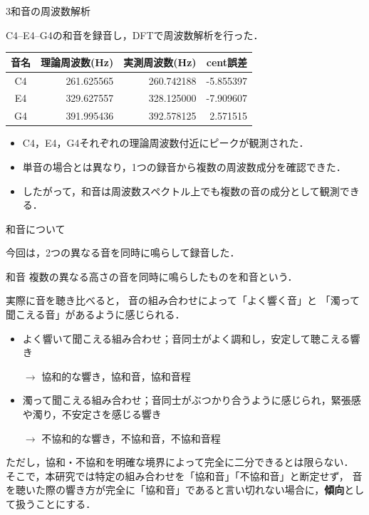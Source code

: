 \documentclass[dvipdfmx,uplatex]{beamer}
\begin{document}
\begin{frame}{3和音の周波数解析}

  C4--E4--G4の和音を録音し，DFTで周波数解析を行った．

  \begin{table}[!ht]
    \centering
    \begin{tabular}{|c|r|r|r|}
      \hline
      音名 & 理論周波数(Hz) & 実測周波数(Hz) & cent誤差 \\ \hline
      C4 & 261.625565 & 260.742188 & -5.855397 \\ \hline
      E4 & 329.627557 & 328.125000 & -7.909607 \\ \hline
      G4 & 391.995436 & 392.578125 & 2.571515 \\ \hline
    \end{tabular}
  \end{table}

  \begin{itemize}
    \item C4，E4，G4それぞれの理論周波数付近にピークが観測された．
    \item 単音の場合とは異なり，1つの録音から複数の周波数成分を確認できた．
    \item したがって，和音は周波数スペクトル上でも複数の音の成分として観測できる．
  \end{itemize}

\end{frame}

\begin{frame}{和音について}

  今回は，2つの異なる音を同時に鳴らして録音した．

  \begin{block}{和音}
    複数の異なる高さの音を同時に鳴らしたものを和音という．
  \end{block}

  実際に音を聴き比べると，
  音の組み合わせによって「よく響く音」と
  「濁って聞こえる音」があるように感じられる．

  \begin{itemize}

    \item よく響いて聞こえる組み合わせ；音同士がよく調和し，安定して聴こえる響き

    $\rightarrow$ 協和的な響き，協和音，協和音程

    \item 濁って聞こえる組み合わせ；音同士がぶつかり合うように感じられ，緊張感や濁り，不安定さを感じる響き

    $\rightarrow$ 不協和的な響き，不協和音，不協和音程

  \end{itemize}

  ただし，協和・不協和を明確な境界によって完全に二分できるとは限らない．
  そこで，本研究では特定の組み合わせを「協和音」「不協和音」と断定せず，
  音を聴いた際の響き方が完全に「協和音」であると言い切れない場合に，\textbf{傾向}として扱うことにする．

\end{frame}
\end{document}
